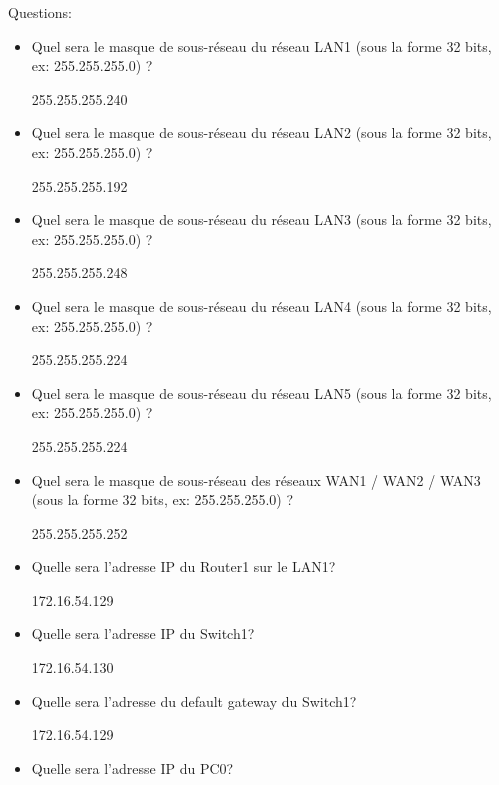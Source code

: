 \documentclass[a4paper]{article}
\begin{document}
Questions:
\begin{itemize}
    \item Quel sera le masque de sous-réseau du réseau LAN1 (sous la forme 32 bits, ex: 255.255.255.0) ?
    \begin{example}
        255.255.255.240
    \end{example}
    \item Quel sera le masque de sous-réseau du réseau LAN2 (sous la forme 32 bits, ex: 255.255.255.0) ?
    \begin{example}
        255.255.255.192
    \end{example}
    \item Quel sera le masque de sous-réseau du réseau LAN3 (sous la forme 32 bits, ex: 255.255.255.0) ?
    \begin{example}
        255.255.255.248
    \end{example}
    \item Quel sera le masque de sous-réseau du réseau LAN4 (sous la forme 32 bits, ex: 255.255.255.0) ?
    \begin{example}
        255.255.255.224
    \end{example}
    \item Quel sera le masque de sous-réseau du réseau LAN5 (sous la forme 32 bits, ex: 255.255.255.0) ?
    \begin{example}
        255.255.255.224
    \end{example}
    \item Quel sera le masque de sous-réseau des réseaux WAN1 / WAN2 / WAN3  (sous la forme 32 bits, ex: 255.255.255.0) ?
    \begin{example}
        255.255.255.252
    \end{example}
    \item Quelle sera l'adresse IP du Router1 sur le LAN1?
    \begin{example}
        172.16.54.129
    \end{example}
    \item Quelle sera l'adresse IP du Switch1?
    \begin{example}
        172.16.54.130
    \end{example}
    \item Quelle sera l'adresse du default gateway du Switch1?
    \begin{example}
        172.16.54.129
    \end{example}
    \item Quelle sera l'adresse IP du PC0?
    \begin{example}

\end{example}
\end{itemize}
\end{document}
